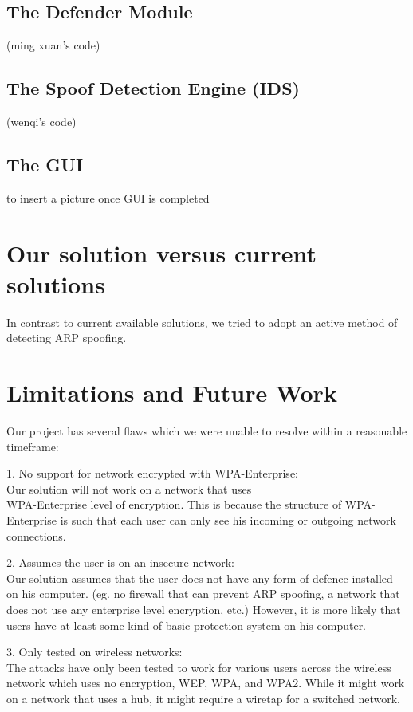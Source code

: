 \documentclass{acm_proc_article-sp}
\begin{document}
\subsection{The Defender Module}

(ming xuan's code) 

\subsection{The Spoof Detection Engine (IDS)}

(wenqi's code)

\subsection{The GUI}

to insert a picture once GUI is completed

\section{Our solution versus current \\solutions}
In contrast to current available solutions, we tried to adopt an active method of detecting ARP spoofing. 

\section{Limitations and Future Work}
Our project has several flaws which we were unable to resolve within a reasonable timeframe: 

1. No support for network encrypted with WPA-Enterprise:\\
Our solution will not work on a network that uses\\ WPA-Enterprise level of encryption. This is because the structure of WPA-Enterprise is such that each user can only see his incoming or outgoing network connections. 

2. Assumes the user is on an insecure network: \\
Our solution assumes that the user does not have any form of defence installed on his computer. (eg. no firewall that can prevent ARP spoofing, a network that does not use any enterprise level encryption, etc.) However, it is more likely that users have at least some kind of basic protection system on his computer. 

3. Only tested on wireless networks:\\
The attacks have only been tested to work for various users across the wireless network which uses no encryption, WEP, WPA, and WPA2. While it might work on a network that uses a hub, it might require a wiretap for a switched network.  
\end{document}
